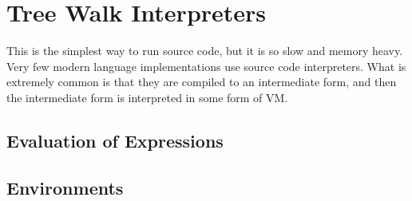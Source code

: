 \section{Tree Walk Interpreters}

  This is the simplest way to run source code, but it is so slow and memory heavy. Very few modern language implementations use source code interpreters. What is extremely common is that they are compiled to an intermediate form, and then the intermediate form is interpreted in some form of VM. 

\subsection{Evaluation of Expressions}

\subsection{Environments}
